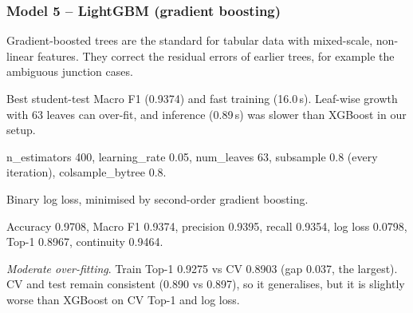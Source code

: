 \documentclass[10pt,a4paper]{article}
\newenvironment{qa}{\begin{description}[leftmargin=0pt,labelsep=0.4em,itemsep=2pt,font=\bfseries\color{accent!80!black}]}{\end{description}}
\begin{document}
\subsubsection*{Model 5 -- LightGBM (gradient boosting)}
\begin{qa}
\item[A1. Why suitable?] Gradient-boosted trees are the standard for tabular data with mixed-scale, non-linear features. They correct the residual errors of earlier trees, for example the ambiguous junction cases.
\item[A2. Strengths / limitations.] Best student-test Macro F1 (0.9374) and fast training (16.0\,s). Leaf-wise growth with 63 leaves can over-fit, and inference (0.89\,s) was slower than XGBoost in our setup.
\item[B5. Hyperparameters.] n\_estimators 400, learning\_rate 0.05, num\_leaves 63, subsample 0.8 (every iteration), colsample\_bytree 0.8.
\item[B6. Objective.] Binary log loss, minimised by second-order gradient boosting.
\item[C7/C8. Student-test.] Accuracy 0.9708, Macro F1 0.9374, precision 0.9395, recall 0.9354, log loss 0.0798, Top-1 0.8967, continuity 0.9464.
\item[C9. Fit.] \emph{Moderate over-fitting}. Train Top-1 0.9275 vs CV 0.8903 (gap 0.037, the largest). CV and test remain consistent (0.890 vs 0.897), so it generalises, but it is slightly worse than XGBoost on CV Top-1 and log loss.
\end{qa}
\end{document}
